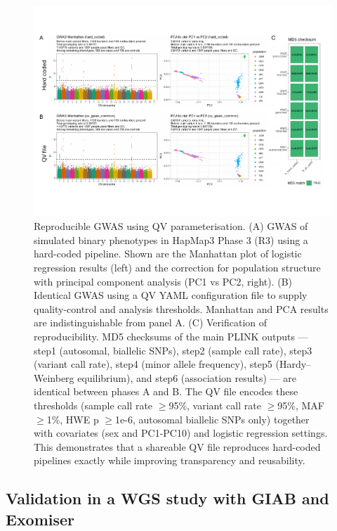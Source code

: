 \begin{figure}[!h]
\centering
\includegraphics[width=\textwidth]{./images/hapmap_gwas_validation.pdf}
    \caption{
Reproducible GWAS using QV parameterisation.
(A) GWAS of simulated binary phenotypes in HapMap3 Phase 3 (R3) using a hard-coded pipeline. Shown are the Manhattan plot of logistic regression results (left) and the correction for population structure with principal component analysis (PC1 vs PC2, right).
(B) Identical GWAS using a QV YAML configuration file to supply quality-control and analysis thresholds. Manhattan and PCA results are indistinguishable from panel A.
(C) Verification of reproducibility. MD5 checksums of the main PLINK outputs — step1 (autosomal, biallelic SNPs), step2 (sample call rate), step3 (variant call rate), step4 (minor allele frequency), step5 (Hardy–Weinberg equilibrium), and step6 (association results) — are identical between phases A and B. The QV file encodes these thresholds (sample call rate $\geq$95\%, variant call rate $\geq$95\%, MAF $\geq$1\%, HWE p $\geq$1e-6, autosomal biallelic SNPs only) together with covariates (sex and PC1-PC10) and logistic regression settings. This demonstrates that a shareable QV file reproduces hard-coded pipelines exactly while improving transparency and reusability.}
    \label{fig:hapmap_gwas_validation}
\end{figure}

\subsection{Validation in a WGS study with GIAB and Exomiser}

